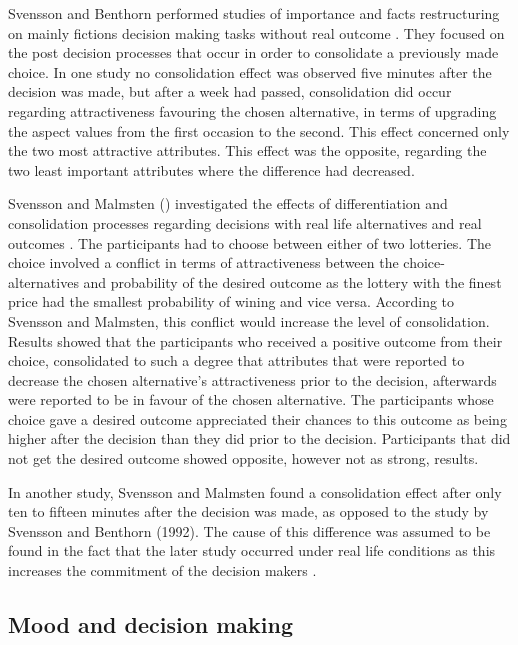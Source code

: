 \documentclass[jou,11pt]{apa6}
\begin{document}
Svensson and Benthorn performed studies of importance and facts
restructuring on mainly fictions decision making tasks without real
outcome \parencite{svensson92a}.  They focused on the post
decision processes that occur in order to consolidate a previously
made choice.  In one study \parencite{svensson92a} no
consolidation effect was observed five minutes after the decision was
made, but after a week had passed, consolidation did occur regarding
attractiveness favouring the chosen alternative,  in terms of
upgrading the aspect values from the first occasion to the second.
This effect concerned only the two most attractive attributes.  This
effect was the opposite, regarding the two least important attributes
where the difference had decreased.

Svensson and Malmsten (\citeyear{SvenssonMalmsten95}) investigated the
effects of differentiation and consolidation processes regarding
decisions with real life alternatives and real outcomes
\parencite{SvenssonMalmsten95}. The participants had to choose between
either of two lotteries. The choice involved a conflict in terms of
attractiveness between the choice-alternatives and probability of the
desired outcome as the lottery with the finest price had the smallest
probability of wining and vice versa.  According to Svensson and
Malmsten, this conflict would increase the level of consolidation.
Results showed that the participants who received a positive outcome
from their choice, consolidated to such a degree that attributes that
were reported to decrease the chosen alternative's attractiveness
prior to the decision, afterwards were reported to be in favour of the
chosen alternative.  The participants whose choice gave a desired
outcome appreciated their chances to this outcome as being higher
after the decision than they did prior to the decision.  Participants
that did not get the desired outcome showed opposite, however not as
strong, results.

In another study, Svensson and Malmsten found a consolidation effect
after only ten to fifteen minutes after the decision was made, as
opposed to the study by Svensson and Benthorn (1992).  The cause of
this difference was assumed to be found in the fact that the later
study occurred under real life conditions as this increases the
commitment of the decision makers \parencite{SvenssonMalmsten95}.


\subsection{Mood and decision making}
\end{document}
